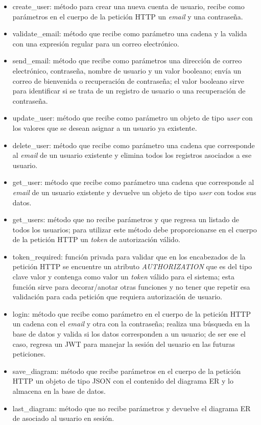 \begin{itemize}
    \item create\_user: método para crear una nueva cuenta de usuario, recibe como parámetros en el cuerpo de la petición HTTP un \textit{email} y una contraseña.
    \item validate\_email: método que recibe como parámetro una cadena y la valida con una expresión regular para un correo electrónico.
    \item send\_email: método que recibe como parámetros una dirección de correo electrónico, contraseña, nombre de usuario y un valor booleano; envía un correo de bienvenida o recuperación de contraseña; el valor booleano sirve para identificar si se trata de un registro de usuario o una recuperación de contraseña.
    \item update\_user: método que recibe como parámetro un objeto de tipo \textit{user} con los valores que se desean asignar a un usuario ya existente.
    \item delete\_user: método que recibe como parámetro una cadena que corresponde al \textit{email} de un usuario existente y elimina todos los registros asociados a ese usuario.
    \item get\_user: método que recibe como parámetro una cadena que corresponde al \textit{email} de un usuario existente y devuelve un objeto de tipo \textit{user} con todos sus datos.
    \item get\_users: método que no recibe parámetros y que regresa un listado de todos los usuarios; para utilizar este método debe proporcionarse en el cuerpo de la petición HTTP un \textit{token} de autorización válido.
    \item token\_required: función privada para validar que en los encabezados de la petición HTTP se encuentre un atributo \textit{AUTHORIZATION} que es del tipo clave valor y contenga como valor un \textit{token} válido para el sistema; esta función sirve para decorar/anotar otras funciones y no tener que repetir esa validación para cada petición que requiera autorización de usuario.
    \item login: método que recibe como parámetro en el cuerpo de la petición HTTP un cadena con el \textit{email} y otra con la contraseña; realiza una búsqueda en la base de datos y valida si los datos corresponden a un usuario; de ser ese el caso, regresa un JWT para manejar la sesión del usuario en las futuras peticiones.
    \item save\_diagram: método que recibe parámetros en el cuerpo de la petición HTTP un objeto de tipo JSON con el contenido del diagrama ER y lo almacena en la base de datos.
    \item last\_diagram: método que no recibe parámetros y devuelve el diagrama ER de asociado al usuario en sesión.
\end{itemize}


